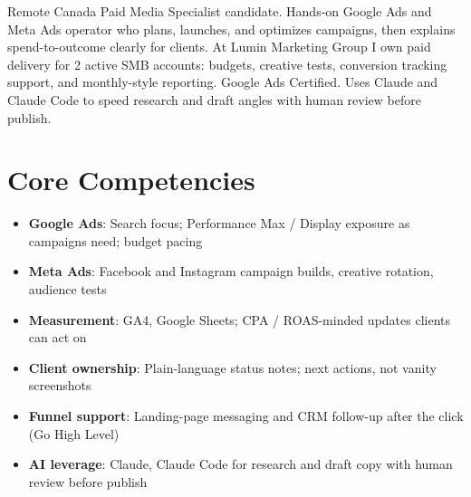 \documentclass[11pt,a4paper,sans]{moderncv}
\begin{document}
\makecvtitle

\vspace{6pt}
\small{Remote Canada Paid Media Specialist candidate. Hands-on Google Ads and Meta Ads operator who plans, launches, and optimizes campaigns, then explains spend-to-outcome clearly for clients. At Lumin Marketing Group I own paid delivery for 2 active SMB accounts: budgets, creative tests, conversion tracking support, and monthly-style reporting. Google Ads Certified. Uses Claude and Claude Code to speed research and draft angles with human review before publish.}

\section{Core Competencies}
\vspace{1pt}
\begin{itemize}
\item \textbf{Google Ads}: Search focus; Performance Max / Display exposure as campaigns need; budget pacing
\item \textbf{Meta Ads}: Facebook and Instagram campaign builds, creative rotation, audience tests
\item \textbf{Measurement}: GA4, Google Sheets; CPA / ROAS-minded updates clients can act on
\item \textbf{Client ownership}: Plain-language status notes; next actions, not vanity screenshots
\item \textbf{Funnel support}: Landing-page messaging and CRM follow-up after the click (Go High Level)
\item \textbf{AI leverage}: Claude, Claude Code for research and draft copy with human review before publish
\end{itemize}
\end{document}

